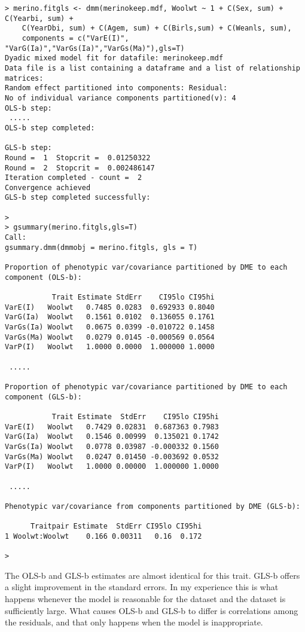 \documentclass[titlepage]{article}  %
\begin{document}
\begin{verbatim}
> merino.fitgls <- dmm(merinokeep.mdf, Woolwt ~ 1 + C(Sex, sum) + C(Yearbi, sum) +
    C(YearDbi, sum) + C(Agem, sum) + C(Birls,sum) + C(Weanls, sum),
    components = c("VarE(I)", "VarG(Ia)","VarGs(Ia)","VarGs(Ma)"),gls=T)
Dyadic mixed model fit for datafile: merinokeep.mdf  
Data file is a list containing a dataframe and a list of relationship matrices:
Random effect partitioned into components: Residual:
No of individual variance components partitioned(v): 4 
OLS-b step:
 .....
OLS-b step completed:

GLS-b step:
Round =  1  Stopcrit =  0.01250322 
Round =  2  Stopcrit =  0.002486147 
Iteration completed - count =  2 
Convergence achieved
GLS-b step completed successfully:

> 
> gsummary(merino.fitgls,gls=T)
Call:
gsummary.dmm(dmmobj = merino.fitgls, gls = T)

Proportion of phenotypic var/covariance partitioned by DME to each component (OLS-b):

           Trait Estimate StdErr    CI95lo CI95hi
VarE(I)   Woolwt   0.7485 0.0283  0.692933 0.8040
VarG(Ia)  Woolwt   0.1561 0.0102  0.136055 0.1761
VarGs(Ia) Woolwt   0.0675 0.0399 -0.010722 0.1458
VarGs(Ma) Woolwt   0.0279 0.0145 -0.000569 0.0564
VarP(I)   Woolwt   1.0000 0.0000  1.000000 1.0000

 .....
 
Proportion of phenotypic var/covariance partitioned by DME to each component (GLS-b):

           Trait Estimate  StdErr    CI95lo CI95hi
VarE(I)   Woolwt   0.7429 0.02831  0.687363 0.7983
VarG(Ia)  Woolwt   0.1546 0.00999  0.135021 0.1742
VarGs(Ia) Woolwt   0.0778 0.03987 -0.000332 0.1560
VarGs(Ma) Woolwt   0.0247 0.01450 -0.003692 0.0532
VarP(I)   Woolwt   1.0000 0.00000  1.000000 1.0000

 .....
 
Phenotypic var/covariance from components partitioned by DME (GLS-b):

      Traitpair Estimate  StdErr CI95lo CI95hi
1 Woolwt:Woolwt    0.166 0.00311   0.16  0.172

> 
\end{verbatim}

The OLS-b and GLS-b estimates are almost identical for this trait. GLS-b offers a slight improvement in the standard errors. In my experience this is what happens whenever the model is reasonable for the dataset and the dataset is sufficiently large. What causes OLS-b and GLS-b to differ is correlations among the residuals, and that only happens when the model is inappropriate.
\end{document}
